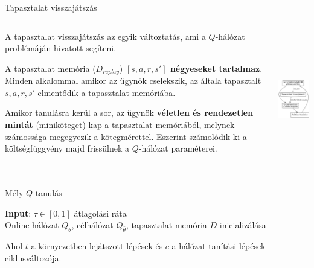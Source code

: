 \documentclass[english, aspectratio=169]{beamer}
\begin{document}
\begin{frame}{Tapasztalat visszajátszás}
\begin{columns}
\begin{column}{.65\textwidth}
A tapasztalat visszajátszás az egyik változtatás, ami a $Q$-hálózat problémáján hivatott segíteni.\par\smallskip
A tapasztalat memória ($D_{replay}$) \textbf{$[s,a,r,s']$ négyeseket tartalmaz}. Minden alkalommal amikor az ügynök cselekszik, az általa tapasztalt $s, a, r, s'$ elmentődik a tapasztalat memóriába.\par\smallskip
Amikor tanulásra kerül a sor, az ügynök \textbf{véletlen és rendezetlen mintát} (miniköteget) kap a tapasztalat memóriából, melynek számossága megegyezik a kötegmérettel. Eszerint számolódik ki a költségfüggvény majd frissülnek a $Q$-hálózat paraméterei.
\end{column}
\begin{column}{.35\textwidth}
\begin{center}
\includegraphics[height=6cm, keepaspectratio]{../../5_ql/doc/graphs/ql_4.png}
\end{center}
\end{column}
\end{columns}
\end{frame}

\begin{frame}{}
\begin{algorithm}[H]
\caption{Mély $Q$-tanulás}
\SetAlgoLined
\textbf{Input}: $\tau \in [0,1]$ átlagolási ráta\\
Online hálózat $Q_\theta$, célhálózat $Q_{\bar{\theta}}$, tapasztalat memória $D$ inicializálása\;
\end{algorithm}
Ahol $t$ a környezetben lejátszott lépések és $c$ a hálózat tanítási lépések ciklusváltozója.
\end{frame}
\end{document}
